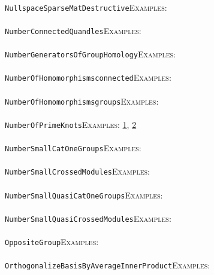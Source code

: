 \documentclass[a4paper,11pt]{report}
\begin{document}
{{ \\
 \texttt{NullspaceSparseMatDestructive}{\nobreakspace}{\nobreakspace}{\nobreakspace}{\nobreakspace}\textsc{Examples:} \\
 \\
 \texttt{NumberConnectedQuandles}{\nobreakspace}{\nobreakspace}{\nobreakspace}{\nobreakspace}\textsc{Examples:} \\
 \\
 \texttt{NumberGeneratorsOfGroupHomology}{\nobreakspace}{\nobreakspace}{\nobreakspace}{\nobreakspace}\textsc{Examples:} \\
 \\
 \texttt{NumberOfHomomorphisms{\textunderscore}connected}{\nobreakspace}{\nobreakspace}{\nobreakspace}{\nobreakspace}\textsc{Examples:} \\
 \\
 \texttt{NumberOfHomomorphisms{\textunderscore}groups}{\nobreakspace}{\nobreakspace}{\nobreakspace}{\nobreakspace}\textsc{Examples:} \\
 \\
 \texttt{NumberOfPrimeKnots}{\nobreakspace}{\nobreakspace}{\nobreakspace}{\nobreakspace}\textsc{Examples:} \href{../www/SideLinks/About/aboutQuandles2.html} {1}{\nobreakspace}, \href{../www/SideLinks/About/aboutQuandles.html} {2}{\nobreakspace} \\
 \\
 \texttt{NumberSmallCatOneGroups}{\nobreakspace}{\nobreakspace}{\nobreakspace}{\nobreakspace}\textsc{Examples:} \\
 \\
 \texttt{NumberSmallCrossedModules}{\nobreakspace}{\nobreakspace}{\nobreakspace}{\nobreakspace}\textsc{Examples:} \\
 \\
 \texttt{NumberSmallQuasiCatOneGroups}{\nobreakspace}{\nobreakspace}{\nobreakspace}{\nobreakspace}\textsc{Examples:} \\
 \\
 \texttt{NumberSmallQuasiCrossedModules}{\nobreakspace}{\nobreakspace}{\nobreakspace}{\nobreakspace}\textsc{Examples:} \\
 \\
 \texttt{OppositeGroup}{\nobreakspace}{\nobreakspace}{\nobreakspace}{\nobreakspace}\textsc{Examples:} \\
 \\
 \texttt{OrthogonalizeBasisByAverageInnerProduct}{\nobreakspace}{\nobreakspace}{\nobreakspace}{\nobreakspace}\textsc{Examples:} \\
}}
\end{document}
